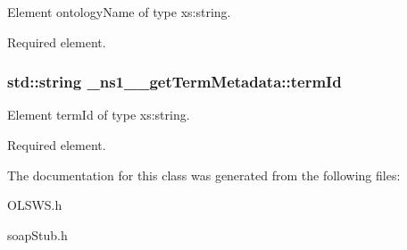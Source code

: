 Element ontologyName of type xs:string. 

Required element. \hypertarget{class__ns1____getTermMetadata_ab47b4b287ed1e7291f6a2bdc8fee4eb6}{
\subsubsection[{termId}]{\setlength{\rightskip}{0pt plus 5cm}std::string {\bf \_\-ns1\_\-\_\-getTermMetadata::termId}}}
\label{class__ns1____getTermMetadata_ab47b4b287ed1e7291f6a2bdc8fee4eb6}


Element termId of type xs:string. 

Required element. 

The documentation for this class was generated from the following files:\begin{DoxyCompactItemize}
\item 
OLSWS.h\item 
soapStub.h\end{DoxyCompactItemize}
